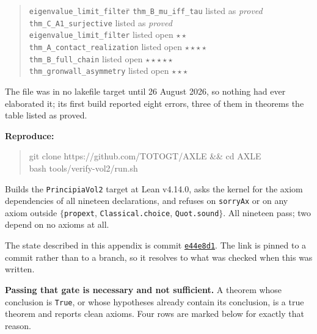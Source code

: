 \documentclass[11pt]{article}
\theoremstyle{boxed}
\begin{document}
\begin{quote}\small
\begin{tabbing}
\texttt{eigenvalue\_limit\_filter}\qquad\= \kill
\texttt{thm\_B\_mu\_iff\_tau}          \> listed as \emph{proved}\\
\texttt{thm\_C\_A1\_surjective}        \> listed as \emph{proved}\\
\texttt{eigenvalue\_limit\_filter}     \> listed open $\star\star$\\
\texttt{thm\_A\_contact\_realization}  \> listed open $\star\star\star\star$\\
\texttt{thm\_B\_full\_chain}           \> listed open $\star\star\star\star\star$\\
\texttt{thm\_gronwall\_asymmetry}      \> listed open $\star\star\star$
\end{tabbing}
\end{quote}

\noindent The file was in no lakefile target until 26 August 2026, so nothing had ever elaborated
it; its first build reported eight errors, three of them in theorems the table listed as proved.

\medskip\noindent\textbf{Reproduce:}
\begin{quote}\ttfamily\small
git clone https://github.com/TOTOGT/AXLE \&\& cd AXLE\\
bash tools/verify-vol2/run.sh
\end{quote}
\noindent Builds the \texttt{PrincipiaVol2} target at Lean v4.14.0, asks the kernel for the axiom
dependencies of all nineteen declarations, and refuses on \texttt{sorryAx} or on any axiom outside
$\{$\texttt{propext}, \texttt{Classical.choice}, \texttt{Quot.sound}$\}$. All nineteen pass; two
depend on no axioms at all.

\smallskip\noindent The state described in this appendix is commit
\href{https://github.com/TOTOGT/AXLE/tree/e44e8d1}{\texttt{e44e8d1}}. The link is pinned to a
commit rather than to a branch, so it resolves to what was checked when this was written.

\medskip\noindent\textbf{Passing that gate is necessary and not sufficient.} A theorem whose
conclusion is \texttt{True}, or whose hypotheses already contain its conclusion, is a true theorem
and reports clean axioms. Four rows are marked below for exactly that reason.
\end{document}
